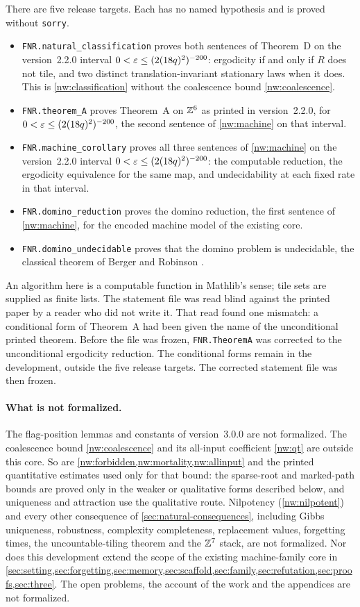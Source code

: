 There are five release targets. Each has no named hypothesis and is proved without \texttt{sorry}.
\begin{itemize}
\item \nolinkurl{FNR.natural_classification} proves both sentences of Theorem~D on the version~2.2.0 interval $0<\varepsilon\le(2(18q)^2)^{-200}$: ergodicity if and only if $R$ does not tile, and two distinct translation-invariant stationary laws when it does. This is \cref{nw:classification} without the coalescence bound \eqref{nw:coalescence}.
\item \nolinkurl{FNR.theorem_A} proves Theorem~A on $\mathbb{Z}^6$ as printed in version~2.2.0, for $0<\varepsilon\le(2(18q)^2)^{-200}$, the second sentence of \cref{nw:machine} on that interval.
\item \nolinkurl{FNR.machine_corollary} proves all three sentences of \cref{nw:machine} on the version~2.2.0 interval $0<\varepsilon\le(2(18q)^2)^{-200}$: the computable reduction, the ergodicity equivalence for the same map, and undecidability at each fixed rate in that interval.
\item \nolinkurl{FNR.domino_reduction} proves the domino reduction, the first sentence of \cref{nw:machine}, for the encoded machine model of the existing core.
\item \nolinkurl{FNR.domino_undecidable} proves that the domino problem is undecidable, the classical theorem of Berger and Robinson \cite{Berger66,Robinson71}.
\end{itemize}
An algorithm here is a computable function in Mathlib's sense; tile sets are supplied as finite lists. The statement file was read blind against the printed paper by a reader who did not write it. That read found one mismatch: a conditional form of Theorem~A had been given the name of the unconditional printed theorem. Before the file was frozen, \nolinkurl{FNR.TheoremA} was corrected to the unconditional ergodicity reduction. The conditional forms remain in the development, outside the five release targets. The corrected statement file was then frozen.

\paragraph{What is not formalized.} The flag-position lemmas and constants of version~3.0.0 are not formalized.  The coalescence bound \eqref{nw:coalescence} and its all-input coefficient \eqref{nw:qt} are outside this core. So are \cref{nw:forbidden,nw:mortality,nw:allinput} and the printed quantitative estimates used only for that bound: the sparse-root and marked-path bounds are proved only in the weaker or qualitative forms described below, and uniqueness and attraction use the qualitative route. Nilpotency (\cref{nw:nilpotent}) and every other consequence of \cref{sec:natural-consequences}, including Gibbs uniqueness, robustness, complexity completeness, replacement values, forgetting times, the uncountable-tiling theorem and the $\mathbb{Z}^7$ stack, are not formalized. Nor does this development extend the scope of the existing machine-family core in \cref{sec:setting,sec:forgetting,sec:memory,sec:scaffold,sec:family,sec:refutation,sec:proofs,sec:three}. The open problems, the account of the work and the appendices are not formalized.


